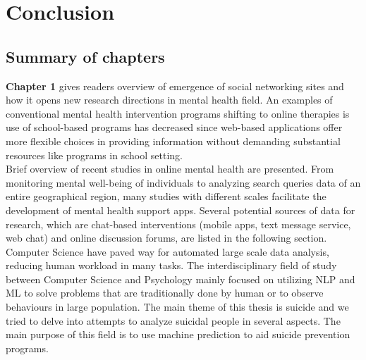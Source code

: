
\chapter{Conclusion}
	\label{chapter:conclusion}%





\section{Summary of chapters}

\textbf{Chapter 1} gives readers overview of emergence of social networking sites and how it opens new research directions in mental health field. An examples of conventional mental health intervention programs shifting to online therapies is use of school-based programs has decreased since web-based applications offer more flexible choices in providing information without demanding substantial resources like programs in school setting.\\
 Brief overview of recent studies in online mental health are presented. From monitoring mental well-being of individuals to analyzing search queries data of an entire geographical region, many studies with different scales facilitate the development of mental health support apps. Several potential sources of data for research, which are chat-based interventions (mobile apps, text message service, web chat) and online discussion forums, are listed in the following section.\\
Computer Science have paved way for automated large scale data analysis, reducing human workload in many tasks. The interdisciplinary field of study between Computer Science and Psychology mainly focused on utilizing NLP and ML to solve problems that are traditionally done by human or to observe behaviours in large population. The main theme of this thesis is suicide and we tried to delve into attempts to analyze suicidal people in several aspects. The main purpose of this field is to use machine prediction to aid suicide prevention programs.\\

